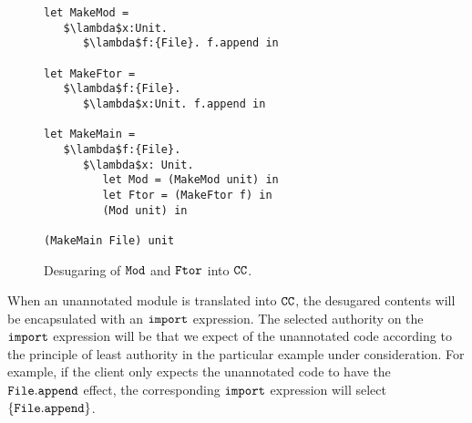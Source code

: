 \begin{figure}[h]

\begin{lstlisting}
let MakeMod =
   $\lambda$x:Unit.
      $\lambda$f:{File}. f.append in

let MakeFtor =
   $\lambda$f:{File}.
      $\lambda$x:Unit. f.append in

let MakeMain =
   $\lambda$f:{File}.
      $\lambda$x: Unit.
         let Mod = (MakeMod unit) in
         let Ftor = (MakeFtor f) in
         (Mod unit) in

(MakeMain File) unit
\end{lstlisting}

\caption{Desugaring of $\mathtt{Mod}$ and $\mathtt{Ftor}$ into $\mathtt{CC}$.}
\label{fig:wyv_tutorial_desugaring}
\end{figure}

When an unannotated module is translated into $\mathtt{CC}$, the desugared contents will be encapsulated with an $\mathtt{import}$ expression. The selected authority on the $\mathtt{import}$ expression will be that we expect of the unannotated code according to the principle of least authority in the particular example under consideration. For example, if the client only expects the unannotated code to have the $\mathtt{File.append}$ effect, the corresponding $\mathtt{import}$ expression will select $\mathtt{\{File.append\}}$.